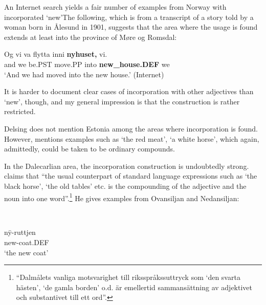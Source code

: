 An Internet search yields a fair number of examples from Norway with incorporated  ‘new’The following, which is from a transcript of a story told by a woman born in Ålesund in 1901, suggests that the area where the usage is found extends at least into the province of Møre og Romsdal:

\ea\label{}
\gll Og  vi  va  flytta  inni  \textbf{nyhuset,} vi.  \\
and  we  be.PST  move.PP  into  \textbf{new\_house.DEF} we  \\
\glt ‘And we had moved into the new house.’ (Internet)
\z

It is harder to document clear cases of incorporation with other adjectives than  ‘new’, though, and my general impression is that the construction is rather restricted.

Delsing does not mention Estonia among the areas where incorporation is found. However, \citet[98]{Tiberg1962} mentions examples such as  ‘the red meat’,  ‘a white horse’, which again, admittedly, could be taken to be ordinary compounds.

In the Dalecarlian area, the incorporation construction is undoubtedly strong. \citet[148]{Levander1928} claims that “the usual counterpart of standard language expressions such as ‘the black horse’, ‘the old tables’ etc. is the compounding of the adjective and the noun into one word”.\footnote{ “Dalmålets vanliga motsvarighet till riksspråkssuttryck som ‘den svarta hästen’, ‘de gamla borden’ o.d. är emellertid sammansättning av adjektivet och substantivet till ett ord”.} He gives examples from Ovansiljan and Nedansiljan: 

\ea
	\\

	\z 
\z 

\ea\label{}
\gll n\={y}-ruttjen\\
new-coat.DEF\\
\glt ‘the new coat’
\z

